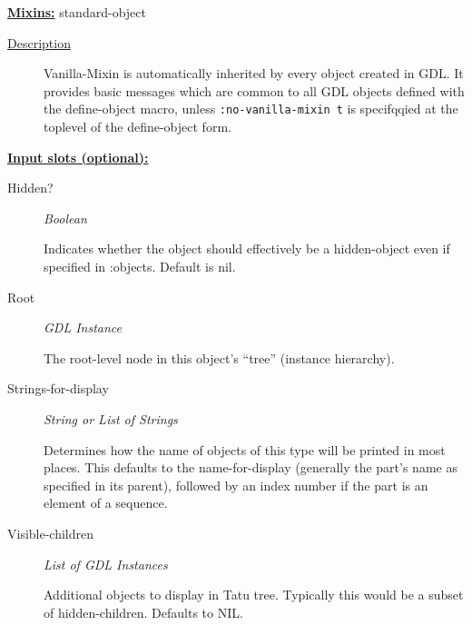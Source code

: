 \documentclass [11pt]{book}
\begin{document}
\begin{itemize}
\textbf{
\underline{Mixins:}} standard-object





\begin{description}

\item [
\underline{Description}]


Vanilla-Mixin is automatically inherited by every object
created in GDL. It provides basic messages which are common to all GDL objects defined
with the define-object macro, unless \texttt{:no-vanilla-mixin t} is specifqqied at the toplevel
of the define-object form.



\end{description}








\textbf{
\underline{Input slots (optional):}}

\begin{description}

\item [Hidden?]
\emph{Boolean}

 Indicates whether the object should effectively be a hidden-object even if specified in :objects. Default is nil.




\item [Root]
\emph{GDL Instance}

 The root-level node in this object's ``tree'' (instance hierarchy).




\item [Strings-for-display]
\emph{String or List of Strings}

 Determines how the name of objects of this type will be printed in most places.
This defaults to the name-for-display (generally the part's name as specified in its
parent), followed by an index number if the part is an element of a sequence.




\item [Visible-children]
\emph{List of GDL Instances}

 Additional objects to display in Tatu tree. Typically this would be a subset of hidden-children. Defaults to NIL.





\end{description}
\end{itemize}
\end{document}
